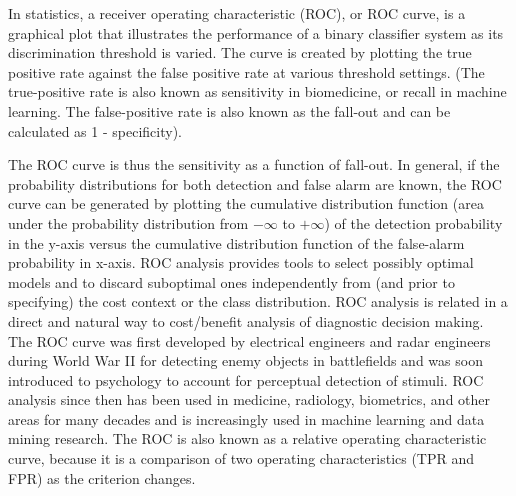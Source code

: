\documentclass[]{report}
\begin{document}
In statistics, a receiver operating characteristic (ROC), or ROC curve, is a graphical plot that illustrates the performance of a binary classifier system as its discrimination threshold is varied. The curve is created by plotting the true positive rate against the false positive rate at various threshold settings. (The true-positive rate is also known as sensitivity in biomedicine, or recall in machine learning. The false-positive rate is also known as the fall-out and can be calculated as 1 - specificity). 

The ROC curve is thus the sensitivity as a function of fall-out. In general, if the probability distributions for both detection and false alarm are known, the ROC curve can be generated by plotting the cumulative distribution function (area under the probability distribution from $-\infty$ to $+\infty$) of the detection probability in the y-axis versus the cumulative distribution function of the false-alarm probability in x-axis.
ROC analysis provides tools to select possibly optimal models and to discard suboptimal ones independently from (and prior to specifying) the cost context or the class distribution. ROC analysis is related in a direct and natural way to cost/benefit analysis of diagnostic decision making.
The ROC curve was first developed by electrical engineers and radar engineers during World War II for detecting enemy objects in battlefields and was soon introduced to psychology to account for perceptual detection of stimuli. ROC analysis since then has been used in medicine, radiology, biometrics, and other areas for many decades and is increasingly used in machine learning and data mining research.
The ROC is also known as a relative operating characteristic curve, because it is a comparison of two operating characteristics (TPR and FPR) as the criterion changes.
\end{document}
